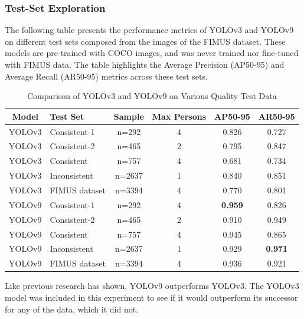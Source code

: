 \subsubsection{Test-Set Exploration}
\label{sec:larger_test_set}
The following table presents the performance metrics of YOLOv3 and YOLOv9 on different test sets composed from the images of the FIMUS dataset. These models are pre-trained with COCO images, and was never trained nor fine-tuned with FIMUS data. The table highlights the Average Precision (AP50-95) and Average Recall (AR50-95) metrics across these test sets.

\begin{table}[H]
    \centering
    \renewcommand{\arraystretch}{1.5} %
    \setlength{\tabcolsep}{1em}
    \begin{tabular}{|c|l|c|c|c|c|}
        \hline
        \rowcolor{gray!25}
        \textbf{Model} & \textbf{Test Set} & \textbf{Sample} & \textbf{Max Persons} & \textbf{AP50-95} & \textbf{AR50-95} \\ \hline
		YOLOv3 & Consistent-1  & n=292 & 4 & 0.826 & 0.727 \\ \hline
		YOLOv3 & Consistent-2  & n=465 & 2 & 0.795 & 0.847 \\ \hline
		YOLOv3 & Consistent    & n=757 & 4 & 0.681 & 0.734 \\ \hline
		YOLOv3 & Inconsistent  & n=2637& 1 & 0.840 & 0.851 \\ \hline
        YOLOv3 & FIMUS dataset & n=3394& 4 & 0.770 & 0.801 \\ \hline
        YOLOv9 & Consistent-1  & n=292 & 4 & \textbf{0.959} & 0.826 \\ \hline
		YOLOv9 & Consistent-2  & n=465 & 2 & 0.910 & 0.949 \\ \hline
		YOLOv9 & Consistent    & n=757 & 4 & 0.945 & 0.865 \\ \hline
		YOLOv9 & Inconsistent  & n=2637& 1 & 0.929 & \textbf{0.971} \\ \hline
        YOLOv9 & FIMUS dataset & n=3394& 4 & 0.936 & 0.921 \\ \hline
    \end{tabular}
    \caption{Comparison of YOLOv3 and YOLOv9 on Various Quality Test Data}
    \label{tab:larger_test_set}
\end{table}

Like previous research has shown, YOLOv9 outperforms YOLOv3. The YOLOv3 model was included in this experiment to see if it would outperform its successor for any of the data, which it did not. 

